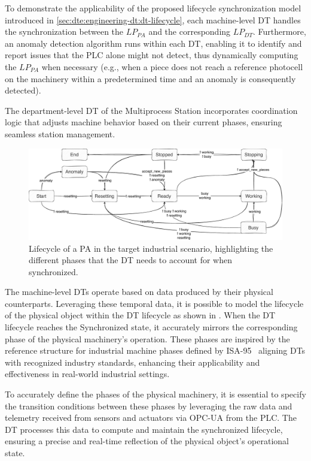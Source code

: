 To demonstrate the applicability of the proposed lifecycle synchronization model introduced in \cref{sec:dte:engineering-dt:dt-lifecycle}, 
each machine-level \ac{DT} handles the synchronization between the $LP_{PA}$ and the corresponding $LP_{DT}$.
%
Furthermore, an anomaly detection algorithm runs within each \ac{DT}, enabling it to identify and report issues that the PLC alone might not detect, thus dynamically computing the $LP_{PA}$ when necessary (e.g., when a piece does not reach a reference photocell on the machinery within a predetermined time and an anomaly is consequently detected).

The department-level \ac{DT} of the Multiprocess Station incorporates coordination logic that adjusts machine behavior based on their current phases, ensuring seamless station management.

\begin{figure}
    \centering
    \includegraphics[width=\textwidth]{figures/dt-lifecycle/graph_machine_logic.pdf}
    \caption{Lifecycle of a \ac{PA} in the target industrial scenario, highlighting the different phases that the \ac{DT} needs to account for when synchronized.}
    \label{fig:graph-machine-logic}
\end{figure}

The machine-level \acp{DT} operate based on data produced by their physical counterparts. Leveraging these temporal data, it is possible to model the lifecycle of the physical object within the DT lifecycle as shown in .
%
When the DT lifecycle reaches the Synchronized state, it accurately mirrors the corresponding phase of the physical machinery's operation.
%
These phases are inspired by the reference structure for industrial machine phases defined by ISA-95~\cite{ISA95} aligning \acp{DT} with recognized industry standards, enhancing their applicability and effectiveness in real-world industrial settings.

To accurately define the phases of the physical machinery,
it is essential to specify the transition conditions between these phases by leveraging the raw data and telemetry received from sensors and actuators via OPC-UA from the PLC.
%
The DT processes this data to compute and maintain the synchronized lifecycle, ensuring a precise and real-time reflection of the physical object's operational state.

